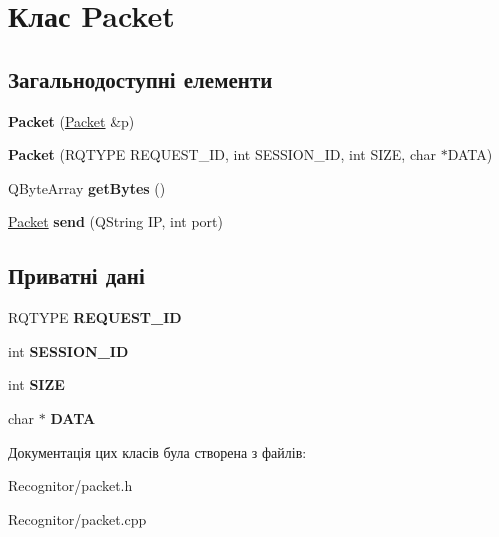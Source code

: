 \hypertarget{classPacket}{\section{Клас Packet}
\label{classPacket}
}
\subsection*{Загальнодоступні елементи}
\begin{DoxyCompactItemize}
\item 
\hypertarget{classPacket_a30fc0d2e5589228708582af6b5b2a576}{{\bfseries Packet} (\hyperlink{classPacket}{Packet} \&p)}\label{classPacket_a30fc0d2e5589228708582af6b5b2a576}

\item 
\hypertarget{classPacket_a3b5e228aeb6b3b4988f69433a9ccfb57}{{\bfseries Packet} (R\-Q\-T\-Y\-P\-E R\-E\-Q\-U\-E\-S\-T\-\_\-\-I\-D, int S\-E\-S\-S\-I\-O\-N\-\_\-\-I\-D, int S\-I\-Z\-E, char $\ast$D\-A\-T\-A)}\label{classPacket_a3b5e228aeb6b3b4988f69433a9ccfb57}

\item 
\hypertarget{classPacket_a0a267f964f5d9bf71159103eda50fbec}{Q\-Byte\-Array {\bfseries get\-Bytes} ()}\label{classPacket_a0a267f964f5d9bf71159103eda50fbec}

\item 
\hypertarget{classPacket_aeca5b2428ba736a24fe08c7322b74bb0}{\hyperlink{classPacket}{Packet} {\bfseries send} (Q\-String I\-P, int port)}\label{classPacket_aeca5b2428ba736a24fe08c7322b74bb0}

\end{DoxyCompactItemize}
\subsection*{Приватні дані}
\begin{DoxyCompactItemize}
\item 
\hypertarget{classPacket_a1e3e5174c14d3fa58d84e3449fbc8528}{R\-Q\-T\-Y\-P\-E {\bfseries R\-E\-Q\-U\-E\-S\-T\-\_\-\-I\-D}}\label{classPacket_a1e3e5174c14d3fa58d84e3449fbc8528}

\item 
\hypertarget{classPacket_ab961c50e0041597c29c52d1e397c5f91}{int {\bfseries S\-E\-S\-S\-I\-O\-N\-\_\-\-I\-D}}\label{classPacket_ab961c50e0041597c29c52d1e397c5f91}

\item 
\hypertarget{classPacket_a095ff3c0e41af547f0f7cc2464b0cb87}{int {\bfseries S\-I\-Z\-E}}\label{classPacket_a095ff3c0e41af547f0f7cc2464b0cb87}

\item 
\hypertarget{classPacket_abc0a29f961bdd40de882e39601884866}{char $\ast$ {\bfseries D\-A\-T\-A}}\label{classPacket_abc0a29f961bdd40de882e39601884866}

\end{DoxyCompactItemize}


Документація цих класів була створена з файлів\-:\begin{DoxyCompactItemize}
\item 
Recognitor/packet.\-h\item 
Recognitor/packet.\-cpp\end{DoxyCompactItemize}
